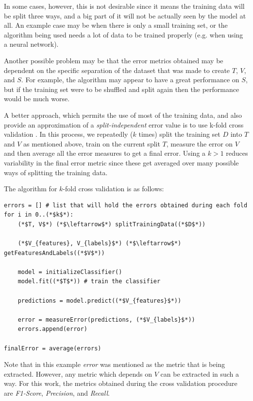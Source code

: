\documentclass[epsfig,a4paper,11pt,titlepage,twoside,openany]{book}
\begin{document}
In some cases, however, this is not desirable since it means the training data will be split three ways, and a big part of it will not be actually seen by the model at all. An example case may be when there is only a small training set, or the algorithm being used needs a lot of data to be trained properly (e.g. when using a neural network).

Another possible problem may be that the error metrics obtained may be dependent on the specific separation of the dataset that was made to create $T$, $V$, and $S$. For example, the algorithm may appear to have a great performance on $S$, but if the training set were to be shuffled and split again then the performance would be much worse.

A better approach, which permits the use of most of the training data, and also provide an approximation of a \textit{split-independent} error value is to use k-fold cross validation \cite{Kohavi:1995_study_of_cross_validation,Cawley:2010_crossval_model_selection}. In this process, we repeatedly ($k$ times) split the training set $D$ into $T$ and $V$ as mentioned above, train on the current split $T$, measure the error on $V$ and then average all the error measures to get a final error. Using a $k > 1$ reduces variability in the final error metric since these get averaged over many possible ways of splitting the training data.

The algorithm for $k$-fold cross validation is as follows:

\begin{lstlisting}
errors = [] # list that will hold the errors obtained during each fold
for i in 0..(*$k$*):
    (*$T, V$*) (*$\leftarrow$*) splitTrainingData((*$D$*))
    
    (*$V_{features}, V_{labels}$*) (*$\leftarrow$*) getFeaturesAndLabels((*$V$*))
    
    model = initializeClassifier()
    model.fit((*$T$*)) # train the classifier
    
    predictions = model.predict((*$V_{features}$*))
    
    error = measureError(predictions, (*$V_{labels}$*))
    errors.append(error)
    
finalError = average(errors)
\end{lstlisting}

Note that in this example \textit{error} was mentioned as the metric that is being extracted. However, any metric which depends on $V$ can be extracted in such a way. For this work, the metrics obtained during the cross validation procedure are \textit{F1-Score}, \textit{Precision}, and \textit{Recall}.
\end{document}
